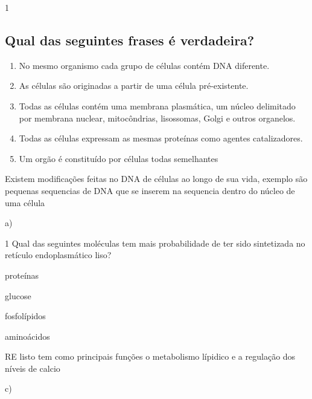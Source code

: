 \documentclass[\mainfilename]{subfiles}
\begin{document}
\begin{questionBox}1{} %
    
    \subsection*{Qual das seguintes frases é verdadeira?}
    
    \begin{enumerate}[label=\alph{enumi})]
        \item No mesmo organismo cada grupo de células contém DNA diferente.
        \item As células são originadas a partir de uma célula pré-existente.
        \item Todas as células contém uma membrana plasmática, um núcleo delimitado por membrana nuclear, mitocôndrias, lisossomas, Golgi e outros organelos.
        \item Todas as células expressam as mesmas proteínas como agentes catalizadores.
        \item Um orgão é constituído por células todas semelhantes
    \end{enumerate}

    \begin{answerBox}{} %
        Existem modificações feitas no DNA de células ao longo de sua vida, exemplo são pequenas sequencias de DNA que se inserem na sequencia dentro do núcleo de uma célula

        a)
    \end{answerBox}

\end{questionBox}


\begin{questionBox}1{ %
    Qual das seguintes moléculas tem mais probabilidade de ter sido sintetizada no retículo endoplasmático liso?
} %


    \begin{enumerate}[label=\alph{enumi})]
        \begin{multicols}{4}
            \item proteínas
            \item glucose
            \item fosfolípidos 
            \item aminoácidos
        \end{multicols}
    \end{enumerate}

    \begin{answerBox}{} %
        RE listo tem como principais funções o metabolismo lípidico e a regulação dos níveis de calcio

        c)
    \end{answerBox}

\end{questionBox}
\end{document}
